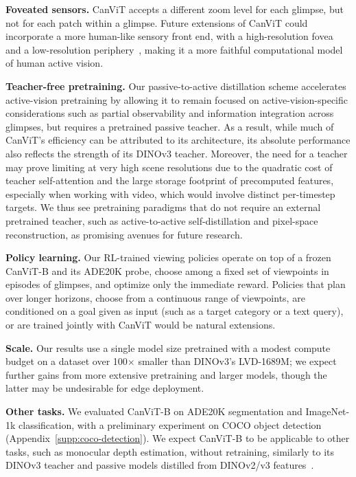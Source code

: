 \documentclass{article}
\begin{document}
\textbf{Foveated sensors.}
CanViT accepts a different zoom level for each glimpse, but not for each patch within a glimpse.
Future extensions of CanViT could incorporate a more human-like sensory front end, with a high-resolution fovea and a low-resolution periphery~\cite{cheungEmergenceFovealImage2017,killickFoveationEraDeep2023,gizdovSeeingMoreLess2025,schmidtSegmentThisThing2025,blauch2026fovi}, making it a more faithful computational model of human active vision.

\textbf{Teacher-free pretraining.}
Our passive-to-active distillation scheme accelerates active-vision pretraining
by allowing it to remain focused on active-vision-specific considerations
such as partial observability and information integration across glimpses,
but requires a pretrained passive teacher.
As a result, while much of CanViT's efficiency can be attributed to its architecture, its absolute performance also reflects the strength of its \mbox{DINOv3} teacher.
Moreover, the need for a teacher may prove limiting at very high scene resolutions
due to the quadratic cost of teacher self-attention
and the large storage footprint of precomputed features,
especially when working with video, which would involve distinct per-timestep targets.
We thus see pretraining paradigms that do not require an external pretrained teacher, such as active-to-active self-distillation and pixel-space reconstruction, as promising avenues for future research.

\textbf{Policy learning.}
Our \ac{RL}-trained viewing policies operate on top of a frozen CanViT-B and its ADE20K probe,
choose among a fixed set of viewpoints in episodes of \rlGlimpses{} glimpses, and optimize only the immediate reward.
Policies that plan over longer horizons, choose from a continuous range of viewpoints, are conditioned on a goal given as input (such as a target category or a text query), or are trained jointly with CanViT
would be natural extensions.

\textbf{Scale.}
Our results use a single model size
pretrained with a modest compute budget
on a dataset over 100$\times$ smaller than DINOv3's LVD-1689M;
we expect further gains from more extensive pretraining and larger models,
though the latter may be undesirable for edge deployment.

\textbf{Other tasks.}
We evaluated CanViT-B on ADE20K segmentation and ImageNet-1k classification, with a preliminary experiment on COCO object detection (Appendix~\ref{supp:coco-detection}).
We expect CanViT-B to be applicable to other tasks, such as monocular depth estimation, without retraining,
similarly to its DINOv3 teacher and passive models distilled from DINOv2/v3 features~\cite{zhang2025accessing}.
\end{document}
